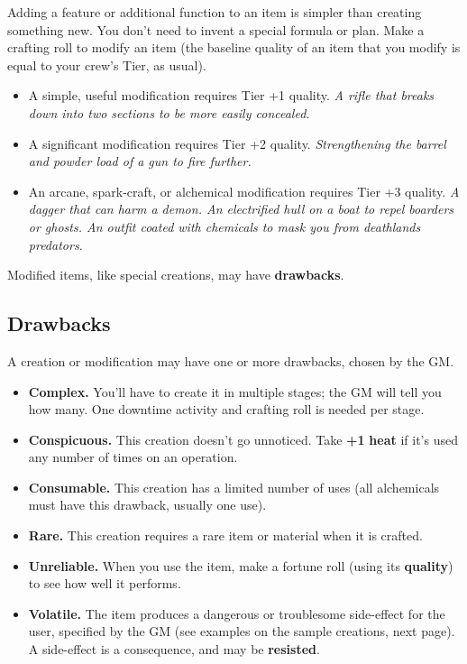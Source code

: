 \documentclass[11pt,oneside]{book}
\newcommand{\gameterm}[1]{\textbf{#1}}
\begin{document}
Adding a feature or additional function to an item is simpler than creating something new. You don’t need to invent a special formula or plan. Make a crafting roll to modify an item (the baseline quality of an item that you modify is equal to your crew’s Tier, as usual).

\begin{itemize}
	\item A simple, useful modification requires Tier +1 quality. \emph{A rifle that breaks down into two sections to be more easily concealed.}
	\item A significant modification requires Tier +2 quality. \emph{Strengthening the barrel and powder load of a gun to fire further.}
	\item An arcane, spark-craft, or alchemical modification requires Tier +3 quality. \emph{A dagger that can harm a demon. An electrified hull on a boat to repel boarders or ghosts. An outfit coated with chemicals to mask you from deathlands predators.}
\end{itemize}

Modified items, like special creations, may have \textbf{drawbacks}.

\subsection{Drawbacks}

A creation or modification may have one or more drawbacks, chosen by the GM.

\begin{itemize}
	\item \gameterm{Complex. } You’ll have to create it in multiple stages; the GM will tell you how many. One downtime activity and crafting roll is needed per stage.
	\item \gameterm{Conspicuous. } This creation doesn’t go unnoticed. Take \textbf{+1} \gameterm{heat}  if it’s used any number of times on an operation.
	\item \gameterm{Consumable.}  This creation has a limited number of uses (all alchemicals must have this drawback, usually one use).
	\item \gameterm{Rare. } This creation requires a rare item or material when it is crafted.
	\item \gameterm{Unreliable. } When you use the item, make a fortune roll (using its \textbf{quality}) to see how well it performs.
	\item \gameterm{Volatile. } The item produces a dangerous or troublesome side-effect for the user, specified by the GM (see examples on the sample creations, next page). A side-effect is a consequence, and may be \textbf{resisted}.
\end{itemize}
\end{document}
